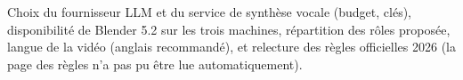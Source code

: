 \begin{warnbox}
Choix du fournisseur LLM et du service de synthèse vocale (budget, clés), disponibilité de Blender 5.2 sur les trois machines, répartition des rôles proposée, langue de la vidéo (anglais recommandé), et relecture des règles officielles 2026 (la page des règles n'a pas pu être lue automatiquement).
\end{warnbox}
